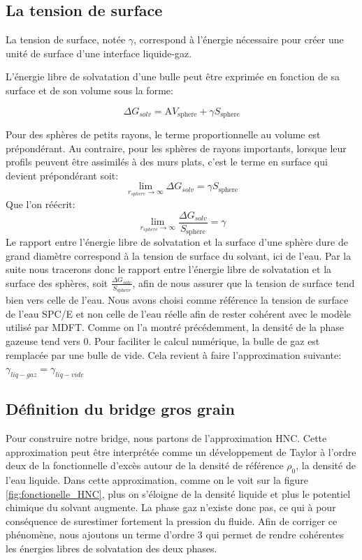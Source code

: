 \subsection{La tension de surface}
La tension de surface, notée $\gamma$, correspond à l'énergie nécessaire pour créer une unité de surface d'une interface liquide-gaz.

L'énergie libre de solvatation d'une bulle peut être exprimée en fonction de sa surface et de son volume sous la forme:

\begin{equation} \label{eq:energie_libre_terme_volume_surface}
\Delta G_{solv}= \mathrm{A} V_{\mathrm{sphere}} + \gamma S_{\mathrm{sphere}} 
\end{equation}

\noindent Pour des sphères de petits rayons, le terme proportionnelle au volume est prépondérant.
Au contraire, pour les sphères de rayons importants, lorsque leur profils peuvent être assimilés à des murs plats, c'est le terme en surface qui devient prépondérant soit:
\begin{equation}
\lim\limits_{r_{sphere} \to \infty} \Delta G_{solv} = \gamma S_{\mathrm{sphere}} 
\end{equation}
Que l'on réécrit:
\begin{equation}
\lim\limits_{r_{sphere} \to \infty} \frac{\Delta G_{solv}}{S_{\mathrm{sphere}}} = \gamma 
\end{equation}
Le rapport entre l'énergie libre de solvatation et la surface d'une sphère dure de grand diamètre correspond à la tension de surface du solvant, ici de l'eau.
Par la suite nous tracerons donc le rapport entre l'énergie libre de solvatation et la surface des sphères, soit $\frac{\Delta G_{solv}}{S_{\mathrm{sphere}}}$, afin de nous assurer que la tension de surface tend bien vers celle de l'eau.
Nous avons choisi comme référence la tension de surface de l'eau SPC/E et non celle de l'eau réelle afin de rester cohérent avec le modèle utilisé par MDFT.
Comme on l'a montré précédemment, la densité de la phase gazeuse tend vers 0. Pour faciliter le calcul numérique, la bulle de gaz est remplacée par une bulle de vide. Cela revient à faire l'approximation suivante: $\gamma_{liq-gaz} = \gamma_{liq-vide}$



\subsection{Définition du bridge gros grain}
Pour construire notre bridge, nous partons de l'approximation HNC. Cette approximation peut être interprétée comme un développement de Taylor à l'ordre deux de la fonctionnelle d'excès autour de la densité de référence $\rho_{0}$, la densité de l'eau liquide.
Dans cette approximation, comme on le voit sur la figure \ref{fig:fonctionelle_HNC}, plus on s'éloigne de la densité liquide et plus le potentiel chimique du solvant augmente. La phase gaz n'existe donc pas, ce qui à pour conséquence de surestimer fortement la pression du fluide.
Afin de corriger ce phénomène, nous ajoutons un terme d'ordre 3 qui permet de rendre cohérentes les énergies libres de solvatation des deux phases.


